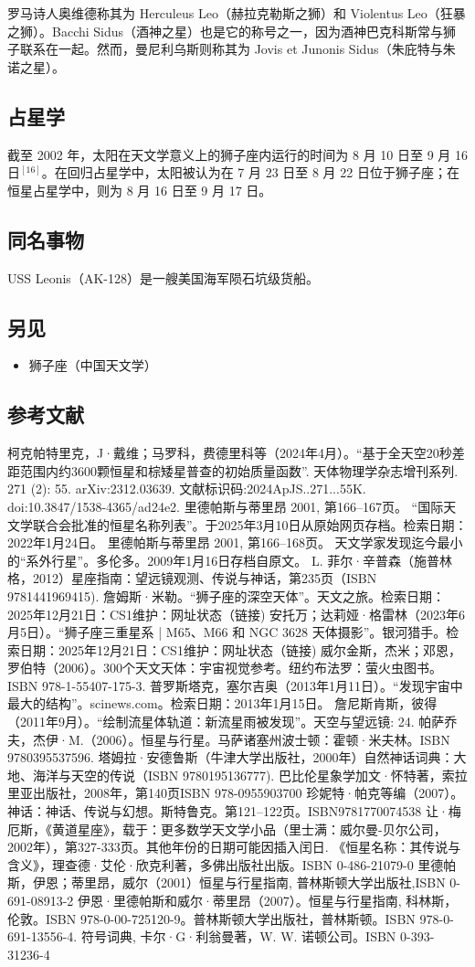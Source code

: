 罗马诗人奥维德称其为 Herculeus Leo（赫拉克勒斯之狮）和 Violentus Leo（狂暴之狮）。Bacchi Sidus（酒神之星）也是它的称号之一，因为酒神巴克科斯常与狮子联系在一起。然而，曼尼利乌斯则称其为 Jovis et Junonis Sidus（朱庇特与朱诺之星）。
\subsection{占星学}  
截至 2002 年，太阳在天文学意义上的狮子座内运行的时间为 8 月 10 日至 9 月 16 日$^{[16]}$。在回归占星学中，太阳被认为在 7 月 23 日至 8 月 22 日位于狮子座；在恒星占星学中，则为 8 月 16 日至 9 月 17 日。
\subsection{同名事物}  
USS Leonis（AK-128）是一艘美国海军陨石坑级货船。
\subsection{另见} 
\begin{itemize}
\item 狮子座（中国天文学）
\end{itemize}
\subsection{参考文献}
 柯克帕特里克，J·戴维；马罗科，费德里科等（2024年4月）。“基于全天空20秒差距范围内约3600颗恒星和棕矮星普查的初始质量函数”. 天体物理学杂志增刊系列. 271 (2): 55. arXiv:2312.03639. 文献标识码:2024ApJS..271...55K. doi:10.3847/1538-4365/ad24e2.
 里德帕斯与蒂里昂 2001, 第166–167页。
 “国际天文学联合会批准的恒星名称列表”。于2025年3月10日从原始网页存档。检索日期：2022年1月24日。
 里德帕斯与蒂里昂 2001, 第166–168页。
 天文学家发现迄今最小的“系外行星”。多伦多。2009年1月16日存档自原文。
 L. 菲尔·辛普森（施普林格，2012）星座指南：望远镜观测、传说与神话，第235页（ISBN 9781441969415).
 詹姆斯·米勒。“狮子座的深空天体”。天文之旅。检索日期：2025年12月21日：CS1维护：网址状态（链接)
 安托万；达莉娅·格雷林（2023年6月5日）。“狮子座三重星系 | M65、M66 和 NGC 3628 天体摄影”。银河猎手。检索日期：2025年12月21日：CS1维护：网址状态（链接)
 威尔金斯，杰米；邓恩，罗伯特（2006）。300个天文天体：宇宙视觉参考。纽约布法罗：萤火虫图书。ISBN 978-1-55407-175-3.
 普罗斯塔克，塞尔吉奥（2013年1月11日）。“发现宇宙中最大的结构”。scinews.com。检索日期：2013年1月15日。
 詹尼斯肯斯，彼得（2011年9月）。“绘制流星体轨道：新流星雨被发现”。天空与望远镜: 24.
 帕萨乔夫，杰伊·M.（2006）。恒星与行星。马萨诸塞州波士顿：霍顿·米夫林。ISBN 9780395537596.
 塔姆拉·安德鲁斯（牛津大学出版社，2000年）自然神话词典：大地、海洋与天空的传说（ISBN 9780195136777).
 巴比伦星象学加文·怀特著，索拉里亚出版社，2008年，第140页ISBN 978-0955903700
 珍妮特·帕克等编（2007）。神话：神话、传说与幻想。斯特鲁克。第121–122页。ISBN9781770074538
 让·梅厄斯，《黄道星座》，载于：更多数学天文学小品（里士满：威尔曼-贝尔公司，2002年），第327-333页。其他年份的日期可能因插入闰日.
《恒星名称：其传说与含义》，理查德·艾伦·欣克利著，多佛出版社出版。ISBN 0-486-21079-0
里德帕斯，伊恩；蒂里昂，威尔（2001）恒星与行星指南, 普林斯顿大学出版社,ISBN 0-691-08913-2
伊恩·里德帕斯和威尔·蒂里昂（2007）。恒星与行星指南, 科林斯，伦敦。ISBN 978-0-00-725120-9。普林斯顿大学出版社，普林斯顿。ISBN 978-0-691-13556-4.
符号词典, 卡尔·G·利翁曼著，W. W. 诺顿公司。ISBN 0-393-31236-4
